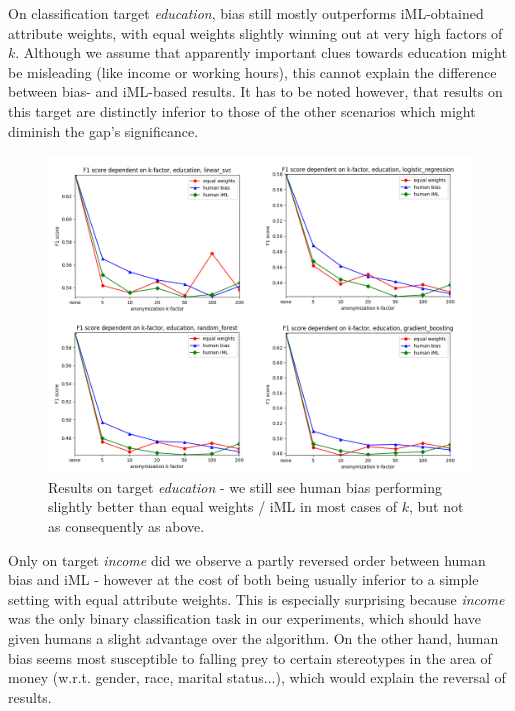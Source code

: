\documentclass{llncs}
\begin{document}
On classification target \textit{education}, bias still mostly outperforms iML-obtained attribute weights, with equal weights slightly winning out at very high factors of $k$. Although we assume that apparently important clues towards education might be misleading (like income or working hours), this cannot explain the difference between bias- and iML-based results. It has to be noted however, that results on this target are distinctly inferior to those of the other scenarios which might diminish the gap's significance.

\begin{figure}[!h]
	\begin{center}
		\includegraphics[width=1\textwidth]{figures/education_num.png}
		\caption{Results on target \textit{education} - we still see human bias performing slightly better than equal weights / iML in most cases of $k$, but not as consequently as above.}
		\label{fig:results_education}
	\end{center}
\end{figure}


Only on target \textit{income} did we observe a partly reversed order between human bias and iML - however at the cost of both being usually inferior to a simple setting with equal attribute weights. This is especially surprising because \textit{income} was the only binary classification task in our experiments, which should have given humans a slight advantage over the algorithm. On the other hand, human bias seems most susceptible to falling prey to certain stereotypes in the area of money (w.r.t. gender, race, marital status...), which would explain the reversal of results.
\end{document}
